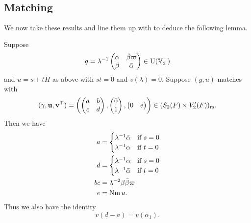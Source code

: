 \subsection{Matching}
We now take these results and line them up with 
to deduce the following lemma.

\begin{lemma}
  \label{lem:finale_match}
  Suppose
  \[ g = \lambda^{-1} \begin{pmatrix}
    \alpha & \bar\beta \varpi \\
    \beta &  \bar\alpha
    \end{pmatrix} \in \operatorname{U}(\mathbb V_2^-) \]
  and $u = s + t \Pi$ as above with $s t = 0$ and $v(\lambda) = 0$.
  Suppose $(g,u)$ matches with
  \[ (\gamma, \mathbf u, \mathbf v^\top) = \left( \begin{pmatrix} a & b \\ c & d \end{pmatrix},
    \begin{pmatrix} 0 \\ 1 \end{pmatrix}, \begin{pmatrix} 0 & e \end{pmatrix} \right)
    \in (S_2(F) \times V'_2(F))_{\mathrm{rs}}. \]
  Then we have
  \begin{align*}
    a &= \begin{cases}
      \lambda^{-1} \bar\alpha & \text{if } s = 0 \\
      \lambda^{-1} \alpha & \text{if } t = 0 \\
    \end{cases} \\
    d &= \begin{cases}
      \lambda^{-1} \alpha & \text{if } s = 0 \\
      \lambda^{-1} \bar\alpha & \text{if } t = 0 \\
    \end{cases} \\
    bc &= \lambda^{-2} \beta \bar\beta \varpi \\
    e &= \operatorname{Nm} u.
  \end{align*}
  Thus we also have the identity
  \[ v(d - a) = v(\alpha_1). \]
\end{lemma}
